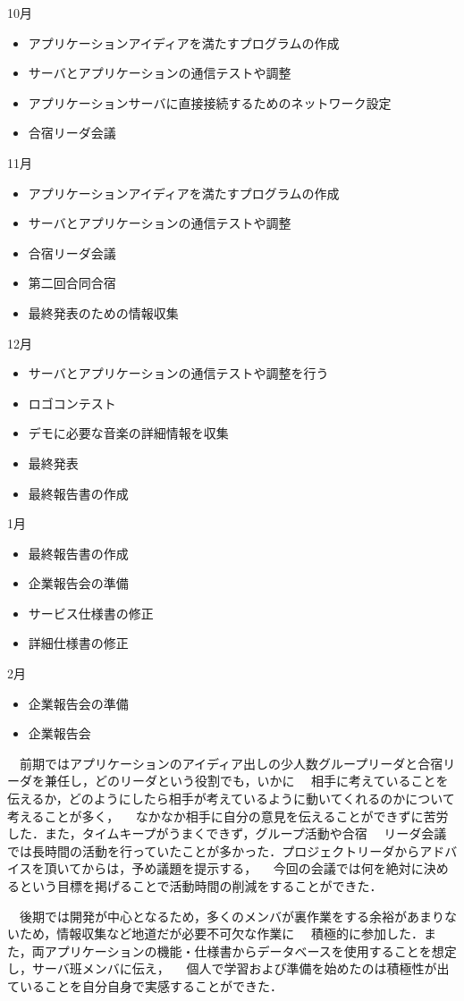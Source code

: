 10月
\begin{itemize}
\item アプリケーションアイディアを満たすプログラムの作成
\item サーバとアプリケーションの通信テストや調整
\item アプリケーションサーバに直接接続するためのネットワーク設定
\item 合宿リーダ会議
\end{itemize}
11月
\begin{itemize}
\item アプリケーションアイディアを満たすプログラムの作成
\item サーバとアプリケーションの通信テストや調整
\item 合宿リーダ会議
\item 第二回合同合宿
\item 最終発表のための情報収集
\end{itemize}
12月
\begin{itemize}
\item サーバとアプリケーションの通信テストや調整を行う
\item ロゴコンテスト
\item デモに必要な音楽の詳細情報を収集
\item 最終発表
\item 最終報告書の作成
\end{itemize}
1月
\begin{itemize}
\item 最終報告書の作成
\item 企業報告会の準備
\item サービス仕様書の修正
\item 詳細仕様書の修正
\end{itemize}
2月
\begin{itemize}
\item 企業報告会の準備
\item 企業報告会
\end{itemize}

\par
　前期ではアプリケーションのアイディア出しの少人数グループリーダと合宿リーダを兼任し，どのリーダという役割でも，いかに
　相手に考えていることを伝えるか，どのようにしたら相手が考えているように動いてくれるのかについて考えることが多く，
　なかなか相手に自分の意見を伝えることができずに苦労した．また，タイムキープがうまくできず，グループ活動や合宿
　リーダ会議では長時間の活動を行っていたことが多かった．プロジェクトリーダからアドバイスを頂いてからは，予め議題を提示する，
　今回の会議では何を絶対に決めるという目標を掲げることで活動時間の削減をすることができた．
\par
　後期では開発が中心となるため，多くのメンバが裏作業をする余裕があまりないため，情報収集など地道だが必要不可欠な作業に
　積極的に参加した．また，両アプリケーションの機能・仕様書からデータベースを使用することを想定し，サーバ班メンバに伝え，
　個人で学習および準備を始めたのは積極性が出ていることを自分自身で実感することができた．

